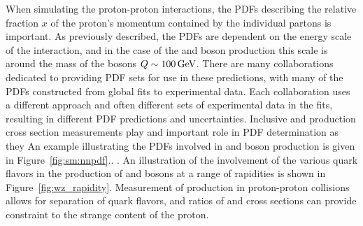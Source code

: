 When simulating the proton-proton interactions, the PDFs describing the relative fraction $x$ of the proton's momentum contained by the individual partons is important. As previously described, the PDFs are dependent on the energy scale of the interaction, and in the case of the \W and \Z boson production this scale is around the mass of the bosons $Q\sim 100 \,\text{Ge\hspace{-.08em}V}$. There are many collaborations dedicated to providing PDF sets for use in these predictions, with many of the PDFs constructed from global fits to experimental data. Each collaboration uses a different approach and often different sets of experimental data in the fits, resulting in different PDF predictions and uncertainties. Inclusive \W and \Z production cross section measurements play and important role in PDF determination as they  An example illustrating the PDFs involved in \W and \Z boson production is given in Figure~\ref{fig:sm:nnpdf}\cite{Ball:2017nwa,Gao:2017yyd,Accardi:2016ndt,Butterworth:2015oua,Rojo:2015acz}.. 
.
An illustration of the involvement of the various quark flavors in the production of \W and \Z bosons at a range of rapidities is shown in Figure~\ref{fig:wz_rapidity}.  Measurement of \W production in proton-proton collisions allows for separation of quark flavors, and ratios of \W and \Z cross sections can provide constraint to the strange content of the proton. 